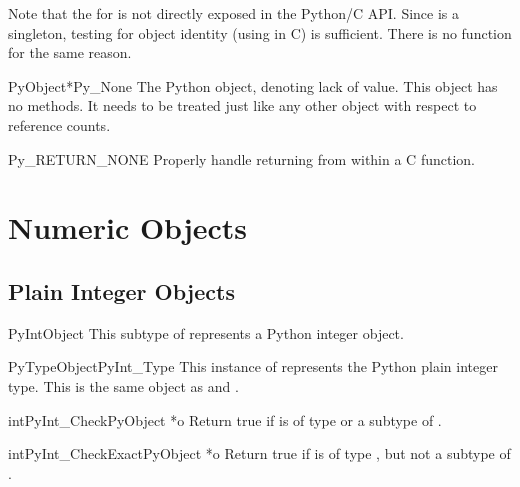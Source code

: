 Note that the  for  is not directly
exposed in the Python/C API.  Since  is a singleton,
testing for object identity (using \samp{==} in C) is sufficient.
There is no  function for the same reason.

\begin{cvardesc}{PyObject*}{Py_None}
  The Python  object, denoting lack of value.  This object
  has no methods.  It needs to be treated just like any other object
  with respect to reference counts.
\end{cvardesc}

\begin{csimplemacrodesc}{Py_RETURN_NONE}
  Properly handle returning  from within a C function.
\end{csimplemacrodesc}


\section{Numeric Objects \label{numericObjects}}



\subsection{Plain Integer Objects \label{intObjects}}

\begin{ctypedesc}{PyIntObject}
  This subtype of  represents a Python integer
  object.
\end{ctypedesc}

\begin{cvardesc}{PyTypeObject}{PyInt_Type}
  This instance of  represents the Python plain
  integer type.  This is the same object as  and
  .
\end{cvardesc}

\begin{cfuncdesc}{int}{PyInt_Check}{PyObject *o}
  Return true if  is of type  or a subtype
  of .
\end{cfuncdesc}

\begin{cfuncdesc}{int}{PyInt_CheckExact}{PyObject *o}
  Return true if  is of type , but not a
  subtype of .
\end{cfuncdesc}

